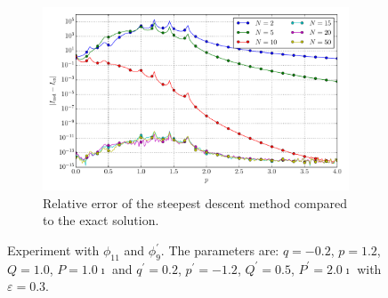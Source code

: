 \documentclass[a4paper,10pt]{article}
\begin{document}
\begin{figure}[ht!]
\begin{subfigure}[t]{0.5\linewidth}
    \includegraphics[width=\linewidth]{./plots/tp_1d_conv_p_11_9_err_rel_nsd.pdf}
    \caption{Relative error of the steepest descent method compared to the exact solution.}
    \label{fig:tp_1d_conv_p_11_9_err_rel_nsd}
  \end{subfigure}
  \label{fig:tp_1d_conv_p_11_9}
  \caption{Experiment with $\phi_{11}$ and $\phi_{9}^{\prime}$.
  The parameters are:
  $q=-0.2$, $p=1.2$, $Q=1.0$, $P=1.0\imath$ and
  $q^\prime=0.2$, $p^\prime=-1.2$, $Q^\prime=0.5$, $P^\prime=2.0\imath$
  with $\varepsilon=0.3$.}
\end{figure}
\end{document}
